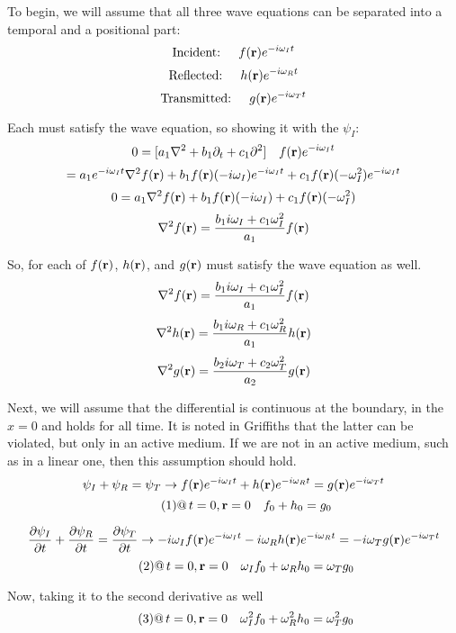 \documentclass[12pt]{article}
\begin{document}
To begin, we will assume that all three wave equations can be separated into a temporal and a positional part:
\[\text{Incident: } \quad f(\vb{r})e^{-i\omega_I t}\]
\[\text{Reflected: } \quad h(\vb{r})e^{-i\omega_R t}\]
\[\text{Transmitted: } \quad g(\vb{r})e^{-i\omega_T t}\]

Each must satisfy the wave equation, so showing it with the $\psi_I$:
\[0 = [a_1\laplacian + b_1 \partial_t + c_1\partial^2]\quad f(\vb{r})e^{-i\omega_I t}\]
\[= a_1 e^{-i\omega_I t} \laplacian{f(\vb{r})} + b_1 f(\vb{r}) (-i\omega_I) e^{-i\omega_I t} + c_1 f(\vb{r}) (-\omega_I^2)e^{-i\omega_I t}\]
\[0 = a_1 \laplacian{f(\vb{r})} + b_1 f(\vb{r}) (-i\omega_I) + c_1 f(\vb{r}) (-\omega_I^2)\]
\[\laplacian{f(\vb{r})} = \frac{b_1 i\omega_I + c_1 \omega_I^2}{a_1} f(\vb{r})\]

So, for each of $f(\vb{r})$, $h(\vb{r})$, and $g(\vb{r})$ must satisfy the wave equation as well.
\[\laplacian{f(\vb{r})} = \frac{b_1 i\omega_I + c_1 \omega_I^2}{a_1} f(\vb{r})\]
\[\laplacian{h(\vb{r})} = \frac{b_1 i\omega_R + c_1 \omega_R^2}{a_1} h(\vb{r})\]
\[\laplacian{g(\vb{r})} = \frac{b_2 i\omega_T + c_2 \omega_T^2}{a_2} g(\vb{r})\]

Next, we will assume that the differential is continuous at the boundary, in the $x = 0$ and holds for all time. It is noted in Griffiths that the latter can be violated, but only in an active medium. If we are not in an active medium, such as in a linear one, then this assumption should hold. 
\[\psi_I + \psi_R = \psi_T \rightarrow f(\vb{r})e^{-i\omega_I t} + h(\vb{r})e^{-i\omega_R t} = g(\vb{r})e^{-i\omega_T t}\]
\begin{equation}
\tag{1}
@ \, t=0, \vb{r}=0 \quad f_0 + h_0 = g_0
\end{equation}

\[\pdv{\psi_I}{t} + \pdv{\psi_R}{t} = \pdv{\psi_T}{t} \rightarrow -i\omega_I f(\vb{r})e^{-i\omega_I t} -i\omega_R h(\vb{r})e^{-i\omega_R t} = -i\omega_T g(\vb{r})e^{-i\omega_T t}\]
\begin{equation}
\tag{2}
@ \, t=0, \vb{r}=0 \quad \omega_I f_0 + \omega_R h_0 = \omega_T g_0
\end{equation}

Now, taking it to the second derivative as well
\begin{equation}
\tag{3}
@ \,  t=0, \vb{r}=0 \quad \omega_I^2 f_0 + \omega_R^2 h_0 = \omega_T^2 g_0
\end{equation}
\end{document}
